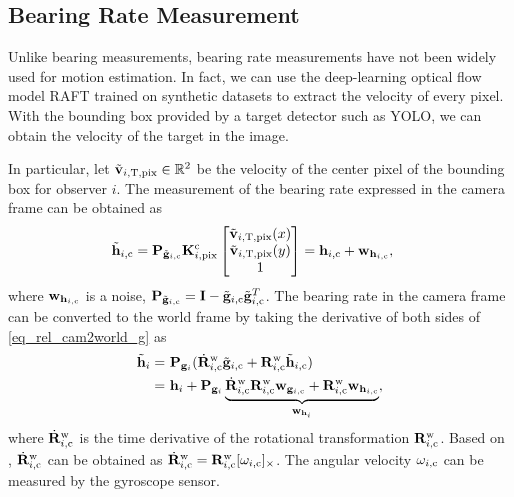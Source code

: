 \documentclass[letterpaper, 10 pt, conference]{ieeeconf}  %
\begin{document}
\subsection{Bearing Rate Measurement}\label{sub_h}

Unlike bearing measurements, bearing rate measurements have not been widely used for motion estimation. In fact, we can use the deep-learning optical flow model RAFT \cite{2020RAFT} trained on synthetic datasets \cite{raft-things} to extract the velocity of every pixel.
With the bounding box provided by a target detector such as YOLO, we can obtain the velocity of the target in the image.

In particular, let $\tilde{\mathbf{v}}_{i, {\rm T, pix}}\in\mathbb{R}^2$ be the velocity of the center pixel of the bounding box for observer $i$. The measurement of the bearing rate expressed in the camera frame can be obtained as
\begin{align}
\tilde{\mathbf{h}}_{i, {\rm c}} & = \mathbf{P}_{\tilde{\mathbf{g}}_{i, {\rm c}}}\mathbf{K}^{\rm c}_{i, {\rm pix}}\begin{bmatrix}
\tilde{\mathbf{v}}_{i, {\rm T, pix}}(x)\\\tilde{\mathbf{v}}_{i, {\rm T, pix}}(y)\\1
\end{bmatrix} = \mathbf{h}_{i, {\rm c}} + \mathbf{w}_{\mathbf{h}_{i, {\rm c}}},
\end{align}
where $\mathbf{w}_{\mathbf{h}_{i, {\rm c}}}$ is a noise, $\mathbf{P}_{\tilde{\mathbf{g}}_{i, {\rm c}}}=\mathbf{I} - \tilde{\mathbf{g}}_{i, {\rm c}}\tilde{\mathbf{g}}_{i, {\rm c}}^T$. The bearing rate in the camera frame can be converted to the world frame by taking the derivative of both sides of \eqref{eq_rel_cam2world_g} as
\begin{align}
\tilde{\mathbf{h}}_i = &~\mathbf{P}_{\mathbf{g}_{i}}(\dot{\mathbf{R}}_{i, {\rm c}}^{\rm w}\tilde{\mathbf{g}}_{i, {\rm c}} + \mathbf{R}_{i, {\rm c}}^{\rm w}\tilde{\mathbf{h}}_{i, {\rm c}})\nonumber\\
= & ~\mathbf{h}_i + \mathbf{P}_{\mathbf{g}_{i}}\underbrace{\dot{\mathbf{R}}_{i, {\rm c}}^{\rm w}\mathbf{R}_{i, {\rm c}}^{\rm w}\mathbf{w}_{\mathbf{g}_{i, {\rm c}}} + \mathbf{R}_{i, {\rm c}}^{\rm w}\mathbf{w}_{\mathbf{h}_{i, {\rm c}}}}_{\mathbf{w}_{\mathbf{h}_i}},\label{eq_noisy_gdot}
\end{align}
where $\dot{\mathbf{R}}_{i, {\rm c}}^{\rm w}$ is the time derivative of the rotational transformation $\mathbf{R}_{i, {\rm c}}^{\rm w}$. Based on \cite{zhao2016time}, $\dot{\mathbf{R}}_{i, {\rm c}}^{\rm w}$ can be obtained as $\dot{\mathbf{R}}_{i, {\rm c}}^{\rm w} = \mathbf{R}_{i, {\rm c}}^{\rm w} [\omega_{i, {\rm c}}]_{\times}$. The angular velocity $\omega_{i, {\rm c}}$ can be measured by the gyroscope sensor.
\end{document}
